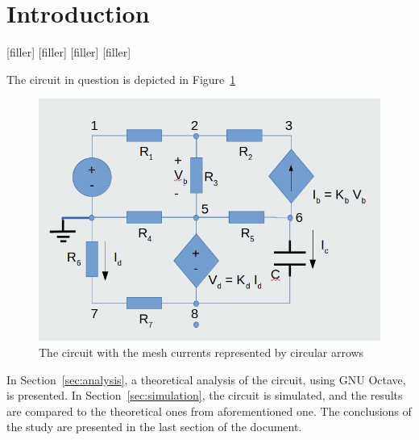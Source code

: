 \section{Introduction}
\label{sec:introduction}


[filler]
[filler]
[filler]
[filler]

The circuit in question is depicted in Figure~\ref{fig:circuit}
\begin{figure}
  \includegraphics[width=\linewidth]{circuit.png}
  \caption{The circuit with the mesh currents represented by circular arrows}
  \label{fig:circuit}
\end{figure}


In Section~\ref{sec:analysis}, a theoretical analysis of the circuit, using GNU Octave,  is presented. In Section~\ref{sec:simulation}, the circuit is simulated, and the results are compared to the theoretical ones from
aforementioned one. The conclusions of the study are presented in the last section of the document.

